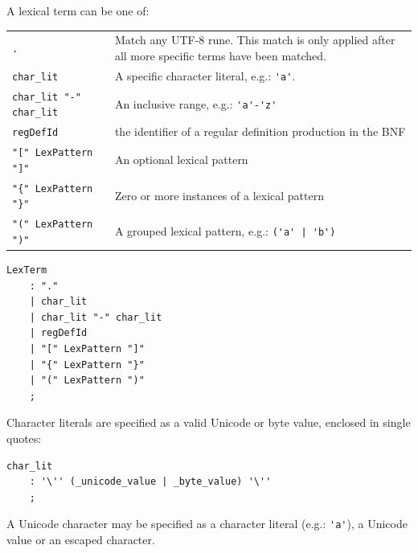 \documentclass[12pt]{article}
\begin{document}
A lexical term can be one of:

\begin{longtable}{lp{12cm}}
	\verb|.| & Match any UTF-8 rune. This match is only applied after all more specific terms have been matched. \\
	\verb|char_lit| & A specific character literal, e.g.: \verb|'a'|. \\
	\verb|char_lit "-" char_lit| & An inclusive range, e.g.: \verb|'a'-'z'| \\
	\verb|regDefId| & the identifier of a regular definition production in the BNF \\
	\verb|"[" LexPattern "]"| & An optional lexical pattern \\
	\verb|"{" LexPattern "}"| & Zero or more instances of a lexical pattern \\
	\verb|"(" LexPattern ")"| & A grouped lexical pattern, e.g.: \verb+('a' | 'b')+ \\
\end{longtable}

\begin{Verbatim}[frame=single]
LexTerm
    : "."
    | char_lit
    | char_lit "-" char_lit
    | regDefId
    | "[" LexPattern "]"
    | "{" LexPattern "}"
    | "(" LexPattern ")"
    ;
\end{Verbatim}

Character literals are specified as a valid Unicode or byte value, enclosed in single quotes:

\begin{Verbatim}[frame=single]
char_lit
    : '\'' (_unicode_value | _byte_value) '\''
    ;
\end{Verbatim}

A Unicode character may be specified as a character literal (e.g.: \verb|'a'|), a Unicode value or an escaped character.
\end{document}
